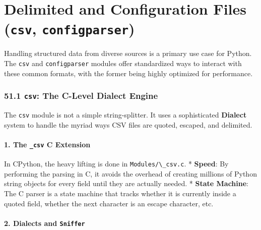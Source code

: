 \hypertarget{delimited-and-configuration-files-csv-configparser}{%
\chapter{\texorpdfstring{Delimited and Configuration Files
(\texttt{csv},
\texttt{configparser})}{Delimited and Configuration Files (csv, configparser)}}\label{delimited-and-configuration-files-csv-configparser}}

Handling structured data from diverse sources is a primary use case for
Python. The \passthrough{\lstinline!csv!} and
\passthrough{\lstinline!configparser!} modules offer standardized ways
to interact with these common formats, with the former being highly
optimized for performance.

\hypertarget{csv-the-c-level-dialect-engine}{%
\subsection{\texorpdfstring{51.1 \texttt{csv}: The C-Level Dialect
Engine}{51.1 csv: The C-Level Dialect Engine}}\label{csv-the-c-level-dialect-engine}}

The \passthrough{\lstinline!csv!} module is not a simple
string-splitter. It uses a sophisticated \textbf{Dialect} system to
handle the myriad ways CSV files are quoted, escaped, and delimited.

\hypertarget{the-_csv-c-extension}{%
\subsubsection{\texorpdfstring{1. The \texttt{\_csv} C
Extension}{1. The \_csv C Extension}}\label{the-_csv-c-extension}}

In CPython, the heavy lifting is done in
\passthrough{\lstinline!Modules/\_csv.c!}. * \textbf{Speed}: By
performing the parsing in C, it avoids the overhead of creating millions
of Python string objects for every field until they are actually needed.
* \textbf{State Machine}: The C parser is a state machine that tracks
whether it is currently inside a quoted field, whether the next
character is an escape character, etc.

\hypertarget{dialects-and-sniffer}{%
\subsubsection{\texorpdfstring{2. Dialects and
\texttt{Sniffer}}{2. Dialects and Sniffer}}\label{dialects-and-sniffer}}

